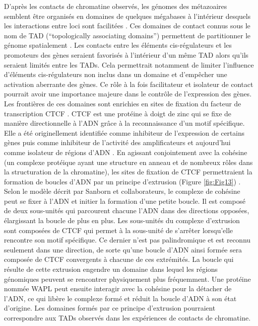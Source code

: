 D’après les contacts de chromatine observés, les génomes des métazoaires semblent être organisés en domaines de quelques mégabases à l’intérieur desquels les interactions entre loci sont facilitées \citep{sexton_role_2015, dixon_topological_2012, rao_3d_2014}. Ces domaines de contact connus sous le nom de \acrshort{TAD} (“topologically associating domains”) permettent de partitionner le génome spatialement \citep{symmons_functional_2014}. Les contacts entre les éléments \gls{cis}-régulateurs et les promoteurs des gènes seraient favorisés à l’intérieur d’un même \acrshort{TAD} alors qu’ils seraient limités entre les \acrshort{TAD}s. Cela permettrait notamment de limiter l’influence d’éléments \gls{cis}-régulateurs non inclus dans un domaine et d’empêcher une activation aberrante des gènes. Ce rôle à la fois facilitateur et isolateur de contact pourrait avoir une importance majeure dans le contrôle de l’expression des gènes. \\

Les frontières de ces domaines sont enrichies en sites de fixation du facteur de transcription CTCF \citep{vietrirudan_comparative_2015}. CTCF est une protéine à doigt de zinc qui se fixe de manière directionnelle à l’ADN grâce à la reconnaissance d’un motif spécifique. Elle a été originellement identifiée comme inhibiteur de l’expression de certains gènes \citep{filippova_exceptionally_1996} puis comme inhibiteur de l’activité des \glspl{amplificateur} et aujourd’hui comme isolateur de régions d'\acrshort{ADN} \citep{bell_protein_1999}. En agissant conjointement avec la cohésine (un complexe protéique ayant une structure en anneau et de nombreux rôles dans la structuration de la chromatine), les sites de fixation de CTCF permettraient la formation de boucles d’ADN par un principe d’extrusion (Figure \ref{fig:Fig13}) \citep{sanborn_chromatin_2015}. Selon le modèle décrit par Sanborn et collaborateurs, le complexe de cohésine peut se fixer à l’ADN et initier la formation d’une petite boucle. Il est composé de deux sous-unités qui parcourent chacune l’ADN dans des directions opposées, élargissant la boucle de plus en plus. Les sous-unités du complexe d’extrusion sont composées de CTCF qui permet à la sous-unité de s’arrêter lorsqu’elle rencontre son motif spécifique. Ce dernier n’est pas palindromique et est reconnu seulement dans une direction, de sorte qu’une boucle d’ADN ainsi formée sera composée de CTCF convergents à chacune de ces extrémités. La boucle qui résulte de cette extrusion engendre un domaine dans lequel les régions génomiques peuvent se rencontrer physiquement plus fréquemment. Une protéine nommée WAPL peut ensuite interagir avec la cohésine pour la détacher de l’ADN, ce qui libère le complexe formé et réduit la boucle d’ADN à son état d’origine. Les domaines formés par ce principe d’extrusion pourraient correspondre aux \acrshort{TAD}s observés dans les expériences de contacts de chromatine. \\

